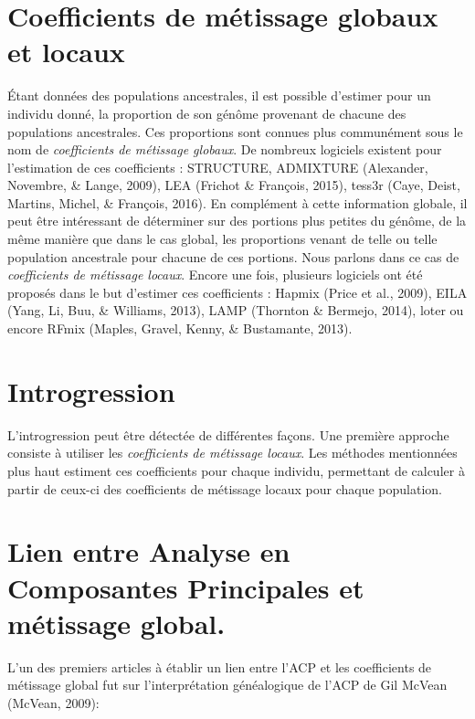 \documentclass[12pt,twoside]{reedthesis}
\begin{document}
  \section{Coefficients de métissage globaux et
  locaux}\label{coefficients-de-metissage-globaux-et-locaux}
  
  Étant données des populations ancestrales, il est possible d'estimer
  pour un individu donné, la proportion de son génôme provenant de chacune
  des populations ancestrales. Ces proportions sont connues plus
  communément sous le nom de \emph{coefficients de métissage globaux}. De
  nombreux logiciels existent pour l'estimation de ces coefficients :
  STRUCTURE, ADMIXTURE (Alexander, Novembre, \& Lange, 2009), LEA (Frichot
  \& François, 2015), tess3r (Caye, Deist, Martins, Michel, \& François,
  2016). En complément à cette information globale, il peut être
  intéressant de déterminer sur des portions plus petites du génôme, de la
  même manière que dans le cas global, les proportions venant de telle ou
  telle population ancestrale pour chacune de ces portions. Nous parlons
  dans ce cas de \emph{coefficients de métissage locaux}. Encore une fois,
  plusieurs logiciels ont été proposés dans le but d'estimer ces
  coefficients : Hapmix (Price et al., 2009), EILA (Yang, Li, Buu, \&
  Williams, 2013), LAMP (Thornton \& Bermejo, 2014), loter ou encore RFmix
  (Maples, Gravel, Kenny, \& Bustamante, 2013).
  
  \section{Introgression}\label{introgression}
  
  L'introgression peut être détectée de différentes façons. Une première
  approche consiste à utiliser les \emph{coefficients de métissage
  locaux}. Les méthodes mentionnées plus haut estiment ces coefficients
  pour chaque individu, permettant de calculer à partir de ceux-ci des
  coefficients de métissage locaux pour chaque population.
  
  \section{Lien entre Analyse en Composantes Principales et métissage
  global.}\label{lien-entre-analyse-en-composantes-principales-et-metissage-global.}
  
  L'un des premiers articles à établir un lien entre l'ACP et les
  coefficients de métissage global fut sur l'interprétation généalogique
  de l'ACP de Gil McVean (McVean, 2009):
  
\end{document}
